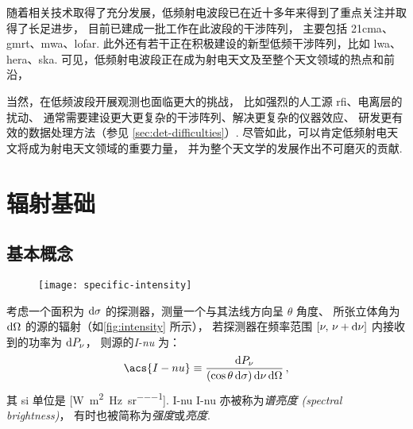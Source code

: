 随着相关技术取得了充分发展，低频射电波段已在近十多年来得到了重点关注并取得了长足进步，
目前已建成一批工作在此波段的干涉阵列，
主要包括 \ac{21cma}、\ac{gmrt}、\ac{mwa}、\ac{lofar}.
此外还有若干正在积极建设的新型低频干涉阵列，比如 \ac{lwa}、\ac{hera}、\ac{ska}.
可见，低频射电波段正在成为射电天文及至整个天文领域的热点和前沿，

当然，在低频波段开展观测也面临更大的挑战，
比如强烈的人工源 \ac{rfi}、电离层的扰动、
通常需要建设更大更复杂的干涉阵列、解决更复杂的仪器效应、
研发更有效的数据处理方法（参见 \autoref{sec:det-difficulties}）.
尽管如此，可以肯定低频射电天文将成为射电天文领域的重要力量，
并为整个天文学的发展作出不可磨灭的贡献.


\section{辐射基础}
\label{sec:radiation}

\subsection{基本概念}

\begin{figure}[htp]
  \centering
  \texttt{[image: specific-intensity]}
  \label{fig:intensity}
\end{figure}

考虑一个面积为 $\mathrm{d}\sigma$ 的探测器，测量一个与其法线方向呈 $\theta$ 角度、
所张立体角为 $\mathrm{d}\Omega$ 的源的辐射（如\autoref{fig:intensity} 所示），
若探测器在频率范围 $[\nu, \,\nu+\mathrm{d}\nu]$ 内接收到的功率为 $\mathrm{d}P_{\nu}$，
则源的\emph{\acf{I-nu}} 为：
\begin{equation}
  \label{eq:intensity}
  \acs{I-nu} \equiv
    \frac{\D{P_{\nu}}}{(\cos\theta\,\D{\sigma}) \,\D{\nu} \,\D{\Omega}} \,,
\end{equation}
其 \ac{si} 单位是 [\si{\watt\per\square\meter\per\hertz\per\steradian}].
\acl{I-nu} \acs{I-nu} 亦被称为\emph{谱亮度 (spectral brightness)}，
有时也被简称为\emph{强度}或\emph{亮度}.

